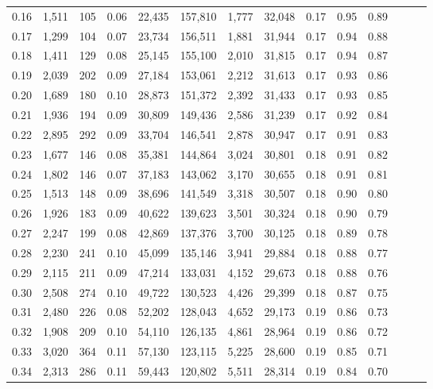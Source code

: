 \begin{tabular}{rrrrrrrrrrrrrr}
0.16 &  1,511 &  105 &  0.06 &   22,435 &  157,810 &   1,777 &  32,048 &  0.17 &  0.95 &      0.89 \\
0.17 &  1,299 &  104 &  0.07 &   23,734 &  156,511 &   1,881 &  31,944 &  0.17 &  0.94 &      0.88 \\
0.18 &  1,411 &  129 &  0.08 &   25,145 &  155,100 &   2,010 &  31,815 &  0.17 &  0.94 &      0.87 \\
0.19 &  2,039 &  202 &  0.09 &   27,184 &  153,061 &   2,212 &  31,613 &  0.17 &  0.93 &      0.86 \\
0.20 &  1,689 &  180 &  0.10 &   28,873 &  151,372 &   2,392 &  31,433 &  0.17 &  0.93 &      0.85 \\
0.21 &  1,936 &  194 &  0.09 &   30,809 &  149,436 &   2,586 &  31,239 &  0.17 &  0.92 &      0.84 \\
0.22 &  2,895 &  292 &  0.09 &   33,704 &  146,541 &   2,878 &  30,947 &  0.17 &  0.91 &      0.83 \\
0.23 &  1,677 &  146 &  0.08 &   35,381 &  144,864 &   3,024 &  30,801 &  0.18 &  0.91 &      0.82 \\
0.24 &  1,802 &  146 &  0.07 &   37,183 &  143,062 &   3,170 &  30,655 &  0.18 &  0.91 &      0.81 \\
0.25 &  1,513 &  148 &  0.09 &   38,696 &  141,549 &   3,318 &  30,507 &  0.18 &  0.90 &      0.80 \\
0.26 &  1,926 &  183 &  0.09 &   40,622 &  139,623 &   3,501 &  30,324 &  0.18 &  0.90 &      0.79 \\
0.27 &  2,247 &  199 &  0.08 &   42,869 &  137,376 &   3,700 &  30,125 &  0.18 &  0.89 &      0.78 \\
0.28 &  2,230 &  241 &  0.10 &   45,099 &  135,146 &   3,941 &  29,884 &  0.18 &  0.88 &      0.77 \\
0.29 &  2,115 &  211 &  0.09 &   47,214 &  133,031 &   4,152 &  29,673 &  0.18 &  0.88 &      0.76 \\
0.30 &  2,508 &  274 &  0.10 &   49,722 &  130,523 &   4,426 &  29,399 &  0.18 &  0.87 &      0.75 \\
0.31 &  2,480 &  226 &  0.08 &   52,202 &  128,043 &   4,652 &  29,173 &  0.19 &  0.86 &      0.73 \\
0.32 &  1,908 &  209 &  0.10 &   54,110 &  126,135 &   4,861 &  28,964 &  0.19 &  0.86 &      0.72 \\
0.33 &  3,020 &  364 &  0.11 &   57,130 &  123,115 &   5,225 &  28,600 &  0.19 &  0.85 &      0.71 \\
0.34 &  2,313 &  286 &  0.11 &   59,443 &  120,802 &   5,511 &  28,314 &  0.19 &  0.84 &      0.70 \\

\end{tabular}
